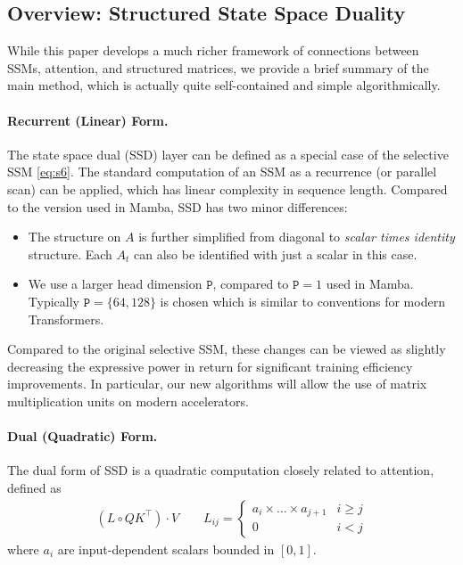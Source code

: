 \subsection{Overview: Structured State Space Duality}

While this paper develops a much richer framework of connections between SSMs, attention, and structured matrices, we provide a brief summary of the main method, which is actually quite self-contained and simple algorithmically.

\paragraph{Recurrent (Linear) Form.}
The state space dual (SSD) layer can be defined as a special case of the selective SSM \eqref{eq:s6}.
The standard computation of an SSM as a recurrence (or parallel scan) can be applied, which has linear complexity in sequence length.
Compared to the version used in Mamba, SSD has two minor differences:
\begin{itemize}
  \item The structure on $A$ is further simplified from diagonal to \emph{scalar times identity} structure.
    Each $A_t$ can also be identified with just a scalar in this case.
  \item We use a larger head dimension $\mathtt{P}$, compared to $\mathtt{P}=1$ used in Mamba. Typically $\mathtt{P}=\{64,128\}$ is chosen which is similar to conventions for modern Transformers. %
\end{itemize}
Compared to the original selective SSM, these changes can be viewed as slightly decreasing the expressive power in return for significant training efficiency improvements.
In particular, our new algorithms will allow the use of matrix multiplication units on modern accelerators.

\paragraph{Dual (Quadratic) Form.}

The dual form of SSD is a quadratic computation closely related to attention, defined as
\begin{align*}%
  (L \circ QK^{\top}) \cdot V \qquad
  L_{ij} = \begin{cases}
    a_i \times \dots \times a_{j+1} & i \ge j \\
    0 & i < j
  \end{cases}
\end{align*}
where $a_i$ are input-dependent scalars bounded in $[0, 1]$.

